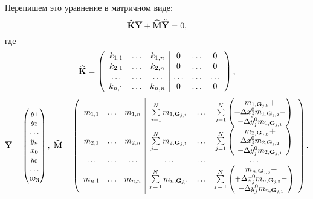 Перепишем это уравнение в матричном виде:
\begin{equation}
	\widehat{\mathbf{K}} \overline{\mathbf{Y}} + \widehat{\mathbf{M}} \ddot{\overline{\mathbf{Y}}} = 0,
	\label{eq:motionEquationLocal}
\end{equation}
где
\begin{equation*}
\widehat{\mathbf{K}}=
\left(
\begin{array}{c c c | c c c}
k_{1,1} & \hdots & k_{1,n} & 0 & \hdots & 0 \\
k_{2,1} & \hdots & k_{2,n} & 0 & \hdots & 0 \\
\hdots & \hdots & \hdots & \hdots & \hdots & \hdots \\
k_{n,1} & \hdots & k_{n,n} & 0 & \hdots & 0 \\
\end{array}
\right),
\end{equation*}
\begin{equation*}
\overline{\mathbf{Y}} =
\begin{pmatrix}
	y_1 \\
	y_2 \\
	\hdots \\
	y_n \\
	x_0 \\
	y_0 \\
	\hdots \\
	\upomega_3
\end{pmatrix}, \
\widehat{\mathbf{M}}=
\left(
\begin{array}{c c c | c c c}
m_{1,1} & \hdots & m_{1,n} &
\sum\limits_{j=1}^N m_{1, \mathbf{G}_{j, 1}} & \hdots
&
\sum\limits_{j=1}^N
\begin{pmatrix}
m_{1,\mathbf{G}_{j,6}} + \\
+ \Delta x_j^0 m_{1, \mathbf{G}_{j,2}} - \\
- \Delta y_j^0 m_{1, \mathbf{G}_{j,1}} \\
\end{pmatrix} \\

m_{2,1} & \hdots & m_{2,n} &
\sum\limits_{j=1}^N m_{2, \mathbf{G}_{j, 1}} & \hdots
&
\sum\limits_{j=1}^N
\begin{pmatrix}
	m_{2,\mathbf{G}_{j,6}} + \\
	+ \Delta x_j^0 m_{2, \mathbf{G}_{j,2}} - \\
	- \Delta y_j^0 m_{2, \mathbf{G}_{j,1}} \\
\end{pmatrix} \\

\hdots & \hdots & \hdots & \hdots & \hdots & \hdots \\

m_{n,1} & \hdots & m_{n,n} 
&
\sum\limits_{j\,=\,1} ^ N m_{n, \mathbf{G}_{j, 1}} 
& 
\hdots
&
\sum\limits_{j\,=\,1} ^ N
\begin{pmatrix}
	m_{n,\mathbf{G}_{j,6}} + \\
	+ \Delta x_j^0 m_{n, \mathbf{G}_{j,2}} - \\
	- \Delta y_j^0 m_{n, \mathbf{G}_{j,1}} \\
\end{pmatrix} \\
\end{array}
\right).
\end{equation*}
